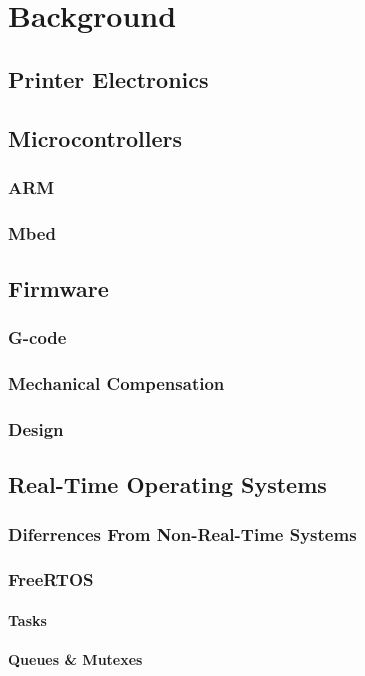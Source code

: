 \chapter{Background}
	
	\section{Printer Electronics}
	
	\section{Microcontrollers}
		
		\subsection{ARM}
		
		\subsection{Mbed}
		
	\section{Firmware}
		
		\subsection{G-code}
		
		\subsection{Mechanical Compensation}
		
		\subsection{Design}
	
	\section{Real-Time Operating Systems}
		
		\subsection{Diferrences From Non-Real-Time Systems}
		
		\subsection{FreeRTOS}
		
			\subsubsection{Tasks}
			
			\subsubsection{Queues \& Mutexes}
